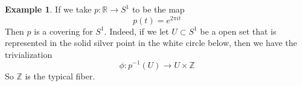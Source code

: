 \documentclass{article}
\theoremstyle{definition}
\newtheorem{exmp}{Example}[section]
\newcommand{\Z}{\mathbb{Z}}
\newcommand{\R}{\mathbb{R}}
\begin{document}
\begin{exmp} If we take $p: \R \rightarrow S^1$ to be the map $$p(t)=e^{2\pi it}$$ Then $p$ is a covering for $S^1$. Indeed, if we let $U\subset S^1$ be a open set that is represented in the solid silver point in the white circle below, then we have the trivialization $$\phi : p^{-1}(U) \rightarrow U \times \Z$$ So $\Z$ is the typical fiber.



\end{exmp}
\end{document}
